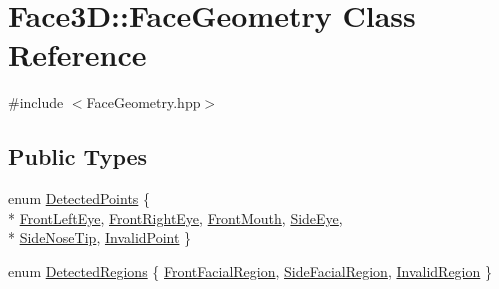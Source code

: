 \hypertarget{class_face3_d_1_1_face_geometry}{}\section{Face3D\+:\+:Face\+Geometry Class Reference}
\label{class_face3_d_1_1_face_geometry}


{\ttfamily \#include $<$Face\+Geometry.\+hpp$>$}

\subsection*{Public Types}
\begin{DoxyCompactItemize}
\item 
enum \hyperlink{class_face3_d_1_1_face_geometry_aab597f00966010882927a4974649bf11}{Detected\+Points} \{ \\*
\hyperlink{class_face3_d_1_1_face_geometry_aab597f00966010882927a4974649bf11a3b8d42b7b6a50b21aa7b45f91d6ca101}{Front\+Left\+Eye}, 
\hyperlink{class_face3_d_1_1_face_geometry_aab597f00966010882927a4974649bf11a8f7e43bdc4f5063cbd2077f07839fefa}{Front\+Right\+Eye}, 
\hyperlink{class_face3_d_1_1_face_geometry_aab597f00966010882927a4974649bf11ae026cb5d275298596d8271989547f308}{Front\+Mouth}, 
\hyperlink{class_face3_d_1_1_face_geometry_aab597f00966010882927a4974649bf11ae6070e4323042c54fd618a58ee59096d}{Side\+Eye}, 
\\*
\hyperlink{class_face3_d_1_1_face_geometry_aab597f00966010882927a4974649bf11aede62853a8d83e60bedafd0ad9fccaf6}{Side\+Nose\+Tip}, 
\hyperlink{class_face3_d_1_1_face_geometry_aab597f00966010882927a4974649bf11aef08736c0cf92fe26e5d281571ac319d}{Invalid\+Point}
 \}
\item 
enum \hyperlink{class_face3_d_1_1_face_geometry_a6db32685a7f429d507b8e31f7c42fe77}{Detected\+Regions} \{ \hyperlink{class_face3_d_1_1_face_geometry_a6db32685a7f429d507b8e31f7c42fe77ab67d7eec01dde53411fead2352b3225f}{Front\+Facial\+Region}, 
\hyperlink{class_face3_d_1_1_face_geometry_a6db32685a7f429d507b8e31f7c42fe77a2e8f6c6895172ac83574e641b90de35a}{Side\+Facial\+Region}, 
\hyperlink{class_face3_d_1_1_face_geometry_a6db32685a7f429d507b8e31f7c42fe77ac1c1cfae295c068738737d0bdbd3cb78}{Invalid\+Region}
 \}
\end{DoxyCompactItemize}
